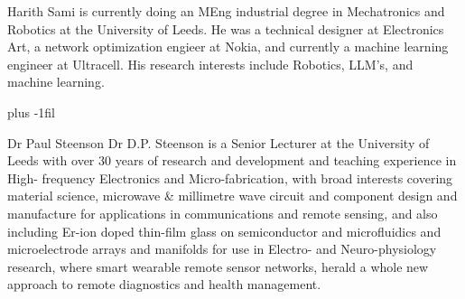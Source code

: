 \documentclass{ieeeaccess}
\begin{document}
\begin{IEEEbiography}{Harith Sami} is currently doing an MEng industrial degree in Mechatronics and Robotics at the University of Leeds. He was a technical designer at Electronics Art, a network optimization engieer at Nokia, and currently a machine learning engineer at Ultracell. His research interests include Robotics, LLM's, and machine learning.
\end{IEEEbiography}

\baselineskip plus -1fil

\begin{IEEEbiography}{Dr Paul Steenson} Dr D.P. Steenson is a Senior Lecturer at the University of Leeds with over 30 years of research and development and teaching experience in High- frequency Electronics and Micro-fabrication, with broad interests covering material science, microwave \& millimetre wave circuit and component design and manufacture for applications in communications and remote sensing, and also including Er-ion doped thin-film glass on semiconductor and microfluidics and microelectrode arrays and manifolds for use in Electro- and Neuro-physiology research, where smart wearable remote sensor networks, herald a whole new approach to remote diagnostics and health management. 
\end{IEEEbiography}



\end{document}
